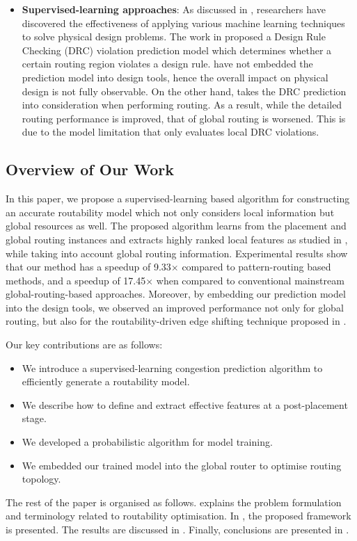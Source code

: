 \begin{itemize}
\item \textbf{Supervised-learning approaches}: As discussed in \cite{mlinphysicaldesign}, researchers have discovered the effectiveness of applying various machine learning techniques to solve physical design problems. The work in \cite{drcpredict18} proposed a Design Rule Checking (DRC) violation prediction model which determines whether a certain routing region  violates a design rule.   \cite{drcpredict18,drcDAT18} have not embedded the prediction model into design tools, hence the overall impact on physical design is not fully observable. On the other hand, \cite{drcingr} takes the DRC prediction into consideration when performing routing. As a result, while the detailed routing performance is improved, that of global routing is worsened. This is  due to the model limitation that only evaluates local DRC violations.
\end{itemize}


\subsection{Overview of Our Work}
In this paper, we propose a supervised-learning based algorithm for constructing an accurate routability model which not only considers local information but global resources as well.
The proposed algorithm learns from the placement and global routing instances and extracts highly ranked local features as studied in \cite{parameterstudy}, while taking into account global routing information.
Experimental results show that our method has a speedup of 9.33$\times$ compared to pattern-routing based methods, and a speedup of 17.45$\times$ when compared to conventional mainstream global-routing-based approaches.
Moreover, by embedding our prediction model into the design tools, we observed an improved performance not only for global routing, but also for the routability-driven edge shifting technique proposed in \cite{fastroute}.


Our key contributions are as follows:
\begin{itemize}
\item We introduce a supervised-learning congestion prediction algorithm to efficiently generate a routability model.
\item We describe how to define and extract effective features at a post-placement stage.
\item We developed a probabilistic algorithm for model training.
\item We embedded our trained model into the global router to optimise routing topology.
\end{itemize}

The rest of the paper is organised as follows.
 explains the problem formulation and terminology related to routability optimisation.
In , the proposed framework is presented.
The results are discussed in . Finally, conclusions are presented in .
